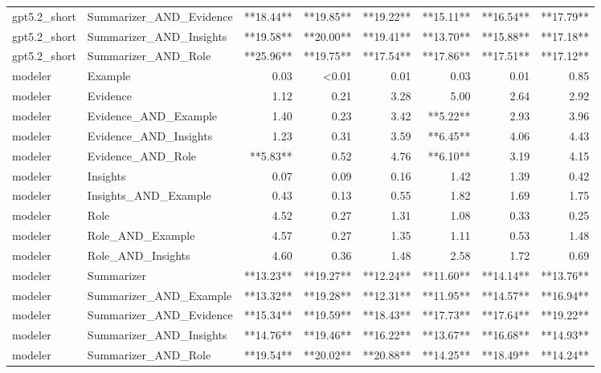 \begin{tabular}{llrrrrrr}
gpt5.2_short & Summarizer_AND_Evidence & **18.44** & **19.85** & **19.22** & **15.11** & **16.54** & **17.79** \\
gpt5.2_short & Summarizer_AND_Insights & **19.58** & **20.00** & **19.41** & **13.70** & **15.88** & **17.18** \\
gpt5.2_short & Summarizer_AND_Role & **25.96** & **19.75** & **17.54** & **17.86** & **17.51** & **17.12** \\
modeler & Example & 0.03 & <0.01 & 0.01 & 0.03 & 0.01 & 0.85 \\
modeler & Evidence & 1.12 & 0.21 & 3.28 & 5.00 & 2.64 & 2.92 \\
modeler & Evidence_AND_Example & 1.40 & 0.23 & 3.42 & **5.22** & 2.93 & 3.96 \\
modeler & Evidence_AND_Insights & 1.23 & 0.31 & 3.59 & **6.45** & 4.06 & 4.43 \\
modeler & Evidence_AND_Role & **5.83** & 0.52 & 4.76 & **6.10** & 3.19 & 4.15 \\
modeler & Insights & 0.07 & 0.09 & 0.16 & 1.42 & 1.39 & 0.42 \\
modeler & Insights_AND_Example & 0.43 & 0.13 & 0.55 & 1.82 & 1.69 & 1.75 \\
modeler & Role & 4.52 & 0.27 & 1.31 & 1.08 & 0.33 & 0.25 \\
modeler & Role_AND_Example & 4.57 & 0.27 & 1.35 & 1.11 & 0.53 & 1.48 \\
modeler & Role_AND_Insights & 4.60 & 0.36 & 1.48 & 2.58 & 1.72 & 0.69 \\
modeler & Summarizer & **13.23** & **19.27** & **12.24** & **11.60** & **14.14** & **13.76** \\
modeler & Summarizer_AND_Example & **13.32** & **19.28** & **12.31** & **11.95** & **14.57** & **16.94** \\
modeler & Summarizer_AND_Evidence & **15.34** & **19.59** & **18.43** & **17.73** & **17.64** & **19.22** \\
modeler & Summarizer_AND_Insights & **14.76** & **19.46** & **16.22** & **13.67** & **16.68** & **14.93** \\
modeler & Summarizer_AND_Role & **19.54** & **20.02** & **20.88** & **14.25** & **18.49** & **14.24** \\
\bottomrule
\end{tabular}
